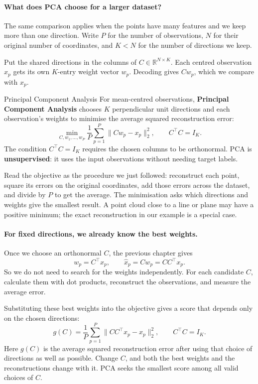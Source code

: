 \documentclass[a4paper,12pt,oneside]{report}
\begin{document}
\paragraph{What does PCA choose for a larger dataset?}
The same comparison applies when the points have many features and
we keep more than one direction. Write $P$ for the number of
observations, $N$ for their original number of coordinates, and
$K<N$ for the number of directions we keep.

Put the shared directions in the columns of
$C\in\mathbb{R}^{N\times K}$. Each centred observation $x_p$ gets
its own $K$-entry weight vector $w_p$. Decoding gives $Cw_p$,
which we compare with $x_p$.

\begin{frameddefn}{Principal Component Analysis}\label{def:pca}
For mean-centred observations, \textbf{Principal Component Analysis}
chooses $K$ perpendicular unit directions and each observation's
weights to minimise the average squared reconstruction error:
\[
  \min_{C,w_1,\ldots,w_P}
    \frac1P\sum_{p=1}^{P}\lVert Cw_p-x_p\rVert_2^2,
  \qquad C^\top C=I_K.
\]
The condition $C^\top C=I_K$ requires the chosen columns to be
orthonormal. PCA is \textbf{unsupervised}: it uses the input
observations without needing target labels.
\end{frameddefn}

Read the objective as the procedure we just followed: reconstruct
each point, square its errors on the original coordinates, add those
errors across the dataset, and divide by $P$ to get the average.
The minimisation asks which directions and weights give the smallest
result. A point cloud close to a line or plane may have a positive
minimum; the exact reconstruction in our example is a special case.

\paragraph{For fixed directions, we already know the best weights.}
Once we choose an orthonormal $C$, the previous chapter gives
\[
  w_p=C^\top x_p,\qquad
  \hat{x}_p=Cw_p=CC^\top x_p.
\]
So we do not need to search for the weights independently. For each
candidate $C$, calculate them with dot products, reconstruct the
observations, and measure the average error.

Substituting these best weights into the objective gives a score
that depends only on the chosen directions:
\[
  g(C)=\frac1P\sum_{p=1}^{P}
    \lVert CC^\top x_p-x_p\rVert_2^2,
  \qquad C^\top C=I_K.
\]
Here $g(C)$ is the average squared reconstruction error after using
that choice of directions as well as possible. Change $C$, and both
the best weights and the reconstructions change with it.
PCA seeks the smallest score among all valid choices of $C$.
\end{document}
